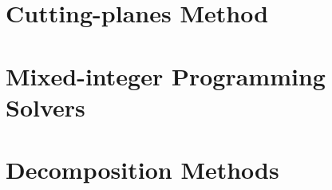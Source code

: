 \documentclass{bookest}
\begin{document}
	\chapter{Cutting-planes Method} \label{chapter_10}
	
	
	\chapter{Mixed-integer Programming Solvers} \label{chapter_11}
	
	
	\chapter{Decomposition Methods} \label{chapter_12}
	
	
	
	 
	
\end{document}
